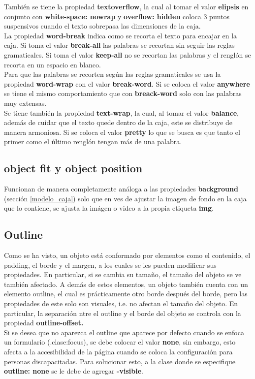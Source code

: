 \documentclass[10pt,oneside]{article}
\begin{document}
\begin{multicols}{2}
    También se tiene la propiedad \textbf{textoverflow}, la cual al tomar el valor \textbf{elipsis} en conjunto con \textbf{white-space: nowrap} y \textbf{overflow: hidden} coloca 3 puntos suspensivos cuando el texto sobrepasa las dimensiones de la caja. \\ \newline La propiedad \textbf{word-break} indica como se recorta el texto para encajar en la caja. Si toma el valor \textbf{break-all} las palabras se recortan sin seguir las reglas gramaticales. Si toma el valor \textbf{keep-all} no se recortan las palabras y el renglón se recorta en un espacio en blanco.\\ \newline
    Para que las palabras se recorten según las reglas gramaticales se usa la propiedad \textbf{word-wrap} con el valor \textbf{break-word}. Si se coloca el valor \textbf{anywhere} se tiene el mismo comportamiento que con \textbf{breack-word} solo con las palabras muy extensas. \\ \newline Se tiene también la propiedad \textbf{text-wrap}, la cual, al tomar el valor \textbf{balance}, además de cuidar que el texto quede dentro de la caja, este se distribuye de manera armoniosa. Si se coloca el valor \textbf{pretty} lo que se busca es que tanto el primer como el último renglón tengan más de una palabra. 
    

\subsection{object fit y object position}

    Funcionan de manera completamente análoga a las propiedades \textbf{background} (sección \ref{modelo_caja}) solo que en ves de ajustar la imagen de fondo en la caja que lo contiene, se ajusta la imágen o video a la propia etiqueta \textbf{img}.

\subsection{Outline}

     Como se ha visto, un objeto está conformado por elementos como el contenido, el padding, el borde y el margen, a los cuales se les pueden modificar sus propiedades. En particular, si se cambia su tamaño, el tamaño del objeto se ve también afectado. A demás de estos elementos, un objeto también cuenta con un elemento outline, el cual es prácticamente otro borde después del borde, pero las propiedades de este solo son visuales, i.e. no afectan el tamaño del objeto. En particular, la separación ntre el outline y el borde del objeto se controla con la propiedad \textbf{outline-offset.} \\ \newline Si se desea que no aparezca el outline que aparece por defecto cuando se enfoca un formulario (.clase:focus), se debe colocar el valor \textbf{none}, sin embargo, esto afecta a la accesibilidad de la página cuando se coloca la configuración para personas discapacitadas. Para solucionar esto, a la clase donde se especifique \textbf{outline: none} se le debe de agregar \textbf{-visible}.


\end{multicols}
\end{document}
